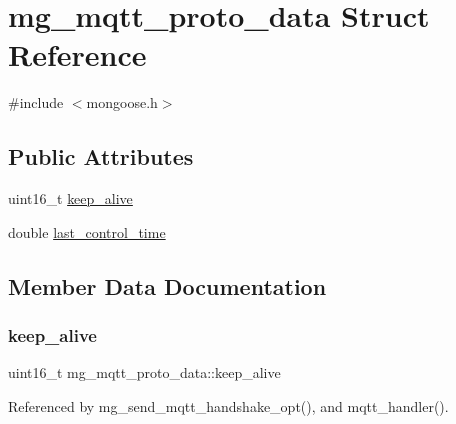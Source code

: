 \hypertarget{structmg__mqtt__proto__data}{}\section{mg\+\_\+mqtt\+\_\+proto\+\_\+data Struct Reference}
\label{structmg__mqtt__proto__data}


{\ttfamily \#include $<$mongoose.\+h$>$}

\subsection*{Public Attributes}
\begin{DoxyCompactItemize}
\item 
uint16\+\_\+t \hyperlink{structmg__mqtt__proto__data_add8062f8f2802a844056ead961485bc0_add8062f8f2802a844056ead961485bc0}{keep\+\_\+alive}
\item 
double \hyperlink{structmg__mqtt__proto__data_afebe290ccf2c1929b1c05a25bfe7f4d7_afebe290ccf2c1929b1c05a25bfe7f4d7}{last\+\_\+control\+\_\+time}
\end{DoxyCompactItemize}


\subsection{Member Data Documentation}
\mbox{\label{structmg__mqtt__proto__data_add8062f8f2802a844056ead961485bc0_add8062f8f2802a844056ead961485bc0}} 
\subsubsection{\texorpdfstring{keep\+\_\+alive}{keep\_alive}}
{\footnotesize\ttfamily uint16\+\_\+t mg\+\_\+mqtt\+\_\+proto\+\_\+data\+::keep\+\_\+alive}



Referenced by mg\+\_\+send\+\_\+mqtt\+\_\+handshake\+\_\+opt(), and mqtt\+\_\+handler().

\mbox{\label{structmg__mqtt__proto__data_afebe290ccf2c1929b1c05a25bfe7f4d7_afebe290ccf2c1929b1c05a25bfe7f4d7}} 
